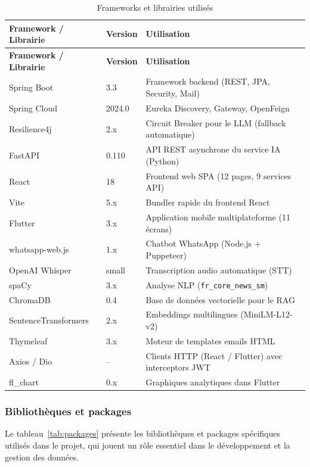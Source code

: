 \begin{longtable}{|p{3.5cm}|p{2cm}|p{7.5cm}|}
\caption{Frameworks et librairies utilis\'{e}s} \label{tab:frameworks} \\
\hline
\textbf{Framework / Librairie} & \textbf{Version} & \textbf{Utilisation} \\
\hline
\endfirsthead
\hline \textbf{Framework / Librairie} & \textbf{Version} & \textbf{Utilisation} \\ \hline
\endhead
Spring Boot \cite{springboot} & 3.3 & Framework backend (REST, JPA, Security, Mail) \\
\hline
Spring Cloud & 2024.0 & Eureka Discovery, Gateway, OpenFeign \\
\hline
Resilience4j & 2.x & Circuit Breaker pour le LLM (fallback automatique) \\
\hline
FastAPI & 0.110 & API REST asynchrone du service IA (Python) \\
\hline
React & 18 & Frontend web SPA (12 pages, 9 services API) \\
\hline
Vite & 5.x & Bundler rapide du frontend React \\
\hline
Flutter \cite{flutter} & 3.x & Application mobile multiplateforme (11 \'{e}crans) \\
\hline
whatsapp-web.js & 1.x & Chatbot WhatsApp (Node.js + Puppeteer) \\
\hline
OpenAI Whisper & small & Transcription audio automatique (STT) \\
\hline
spaCy & 3.x & Analyse NLP (\texttt{fr\_core\_news\_sm}) \\
\hline
ChromaDB & 0.4 & Base de donn\'{e}es vectorielle pour le RAG \\
\hline
SentenceTransformers & 2.x & Embeddings multilingues (MiniLM-L12-v2) \\
\hline
Thymeleaf & 3.x & Moteur de templates emails HTML \\
\hline
Axios / Dio & -- & Clients HTTP (React / Flutter) avec interceptors JWT \\
\hline
fl\_chart & 0.x & Graphiques analytiques dans Flutter \\
\hline
\end{longtable}

\subsubsection{Biblioth\`{e}ques et packages}

Le tableau~\ref{tab:packages} pr\'{e}sente les biblioth\`{e}ques et packages sp\'{e}cifiques utilis\'{e}s dans le projet, qui jouent un r\^{o}le essentiel dans le d\'{e}veloppement et la gestion des donn\'{e}es.

